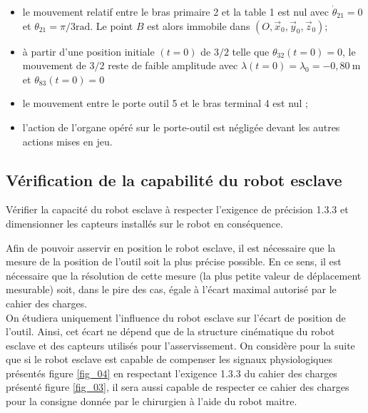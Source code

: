 \begin{itemize}
  \item le mouvement relatif entre le bras primaire 2 et la table 1 est nul avec $\dot{\theta}_{21}=0$ et $\theta_{21}=\pi / 3 \mathrm{rad}$. Le point $B$ est alors immobile dans $\left(O, \vec{x}_{0}, \vec{y}_{0}, \vec{z}_{0}\right)$;
  \item à partir d'une position initiale $(t=0)$ de $3 / 2$ telle que $\theta_{32}(t=0)=0$, le mouvement de $3 / 2$ reste de faible amplitude avec $\lambda(t=0)=\lambda_{0}=-0,80 \mathrm{~m}$ et $\theta_{83}(t=0)=0$
  \item le mouvement entre le porte outil 5 et le bras terminal 4 est nul ;
  \item l'action de l'organe opéré sur le porte-outil est négligée devant les autres actions mises en jeu.
\end{itemize}

\subsection{Vérification de la capabilité du robot esclave}
\begin{obj}
Vérifier la capacité du robot esclave à respecter l'exigence de précision 1.3.3 et dimensionner les capteurs installés sur le robot en conséquence.
\end{obj}

Afin de pouvoir asservir en position le robot esclave, il est nécessaire que la mesure de la position de l'outil soit la plus précise possible. En ce sens, il est nécessaire que la résolution de cette mesure (la plus petite valeur de déplacement mesurable) soit, dans le pire des cas, égale à l'écart maximal autorisé par le cahier des charges.\\
On étudiera uniquement l'influence du robot esclave sur l'écart de position de l'outil. Ainsi, cet écart ne dépend que de la structure cinématique du robot esclave et des capteurs utilisés pour l'asservissement. On considère pour la suite que si le robot esclave est capable de compenser les signaux physiologiques présentés figure \ref{fig_04} en respectant l'exigence 1.3.3 du cahier des charges présenté figure \ref{fig_03}, il sera aussi capable de respecter ce cahier des charges pour la consigne donnée par le chirurgien à l'aide du robot maitre.\\

